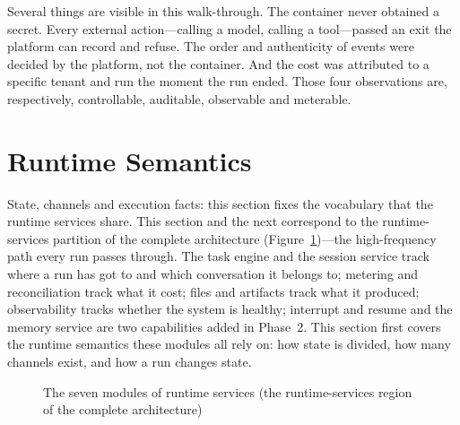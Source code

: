 Several things are visible in this walk-through. The container never obtained a secret. Every external action---calling a model, calling a tool---passed an exit the platform can record and refuse. The order and authenticity of events were decided by the platform, not the container. And the cost was attributed to a specific tenant and run the moment the run ended. Those four observations are, respectively, controllable, auditable, observable and meterable.

\section{Runtime Semantics}
\label{sec:runtime}

State, channels and execution facts: this section fixes the vocabulary that the runtime services share. This section and the next correspond to the runtime-services partition of the complete architecture (Figure~\ref{fig:zoom-data})---the high-frequency path every run passes through. The task engine and the session service track where a run has got to and which conversation it belongs to; metering and reconciliation track what it cost; files and artifacts track what it produced; observability tracks whether the system is healthy; interrupt and resume and the memory service are two capabilities added in Phase~2. This section first covers the runtime semantics these modules all rely on: how state is divided, how many channels exist, and how a run changes state.

\begin{figure}[htbp]
\centering
{}
\caption[Runtime services]{The seven modules of runtime services (the runtime-services region of the complete architecture)}
\label{fig:zoom-data}
\end{figure}

